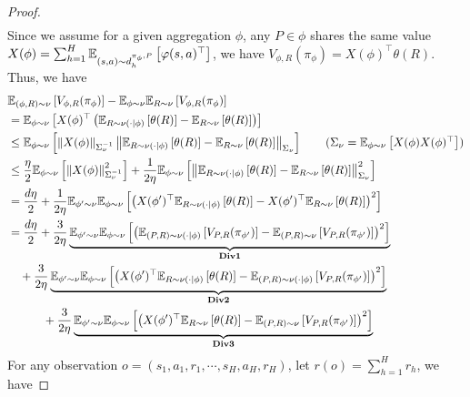 \begin{proof}
\begin{align*}
\end{align*}
Since we assume for a given aggregation $\phi$, any $P \in \phi$ shares the same value $X(\phi) = \sum_{h=1}^H \mathbb{E}_{(s,a) \sim d_{h}^{\pi_{\phi}, P}}\left[\varphi(s,a)^\top\right]$, we have $V_{\phi, R}(\pi_{\phi}) = X(\phi)^\top \theta(R)$. Thus, we have
\begin{align*}
    &\E_{(\phi ,R) \sim \nu}\left[ V_{\phi, R}(\pi_{\phi})\right] - \E_{\phi \sim \nu}\E_{R \sim \nu}\left[V_{\phi, R}(\pi_{\phi})\right]
    \\&= \E_{\phi \sim \nu}\left[X(\phi)^\top\left(\E_{R \sim \nu(\cdot|\phi)}\left[\theta(R)\right] - \E_{R \sim \nu}\left[\theta(R)\right]\right)\right]
    \\&\le  \E_{\phi \sim \nu}\left[\left\|X(\phi)\right\|_{\Sigma_{\nu}^{-1}}\left\|\E_{R \sim \nu(\cdot|\phi)}\left[\theta(R)\right] - \E_{R \sim \nu}\left[\theta(R)\right]\right\|_{\Sigma_{\nu}}\right] \tag{$\Sigma_{\nu} = \E_{\phi \sim \nu}\left[X(\phi)X(\phi)^\top\right]$}
    \\&\le \frac{\eta}{2}\E_{\phi \sim \nu}\left[\left\|X(\phi)\right\|_{\Sigma_{\nu}^{-1}}^2\right]  + \frac{1}{2\eta}\E_{\phi \sim \nu}\left[\left\|\E_{R \sim \nu(\cdot|\phi)}\left[\theta(R)\right] - \E_{R \sim \nu}\left[\theta(R)\right]\right\|_{\Sigma_{\nu}}^2\right]
    \\&= \frac{d\eta}{2} + \frac{1}{2\eta}\E_{\phi' \sim \nu}\E_{\phi \sim \nu}\left[\left(X(\phi')^\top\E_{R \sim \nu(\cdot|\phi)}\left[\theta(R)\right] - X(\phi')^\top\E_{R \sim \nu}\left[\theta(R)\right]\right)^2\right]
    \\&= \frac{d\eta}{2} + \frac{3}{2\eta}\underbrace{\E_{\phi' \sim \nu}\E_{\phi \sim \nu}\left[\left(\E_{(P,R) \sim \nu(\cdot|\phi)}\left[V_{P,R}(\pi_{\phi'})\right] - \E_{(P,R) \sim \nu}\left[V_{P,R}(\pi_{\phi'})\right]\right)^2\right]}_{\textbf{Div1}}
    \\& \quad  + \frac{3}{2\eta}\underbrace{\E_{\phi' \sim \nu}\E_{\phi \sim \nu}\left[\left(X(\phi')^\top\E_{R \sim \nu(\cdot|\phi)}\left[\theta(R)\right] - \E_{(P,R) \sim \nu(\cdot|\phi)}\left[V_{P,R}(\pi_{\phi'})\right] \right)^2\right]}_{\textbf{Div2}}
    \\& \qquad \quad + \frac{3}{2\eta}\underbrace{\E_{\phi' \sim \nu}\E_{\phi \sim \nu}\left[\left(X(\phi')^\top\E_{R \sim \nu}\left[\theta(R)\right] - \E_{(P,R) \sim \nu}\left[V_{P,R}(\pi_{\phi'})\right] \right)^2\right]}_{\textbf{Div3}}
\end{align*}
For any observation $o  = (s_1, a_1, r_1, \cdots, s_H, a_H, r_H)$, let $r(o) = \sum_{h=1}^H r_h$, we have

\end{proof}
